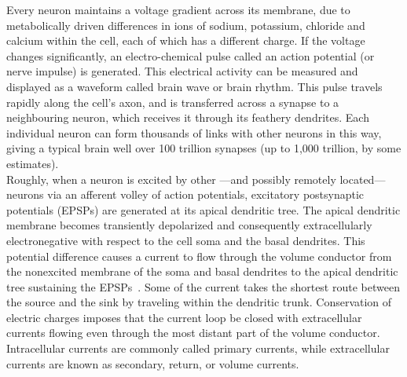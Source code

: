 Every neuron maintains a voltage gradient across its membrane, due to metabolically driven differences in ions of sodium, potassium, chloride and calcium within the cell, each of which has a different charge. If the voltage changes significantly, an electro-chemical pulse called an action potential (or nerve impulse) is generated. This electrical activity can be measured and displayed as a waveform called brain wave or brain rhythm. This pulse travels rapidly along the cell's axon, and is transferred across a synapse to a neighbouring neuron, which receives it through its feathery dendrites. Each individual neuron can form thousands of links with other neurons in this way, giving a typical brain well over 100 trillion synapses (up to 1,000 trillion, by some estimates).\\

Roughly, when a neuron is excited by other —and possibly remotely located— neurons via an afferent volley of action potentials, excitatory postsynaptic potentials (EPSPs) are generated at its apical dendritic tree. The apical dendritic membrane becomes transiently depolarized and consequently extracellularly electronegative with respect to the cell soma and the basal dendrites. This potential difference causes a current to flow through the volume conductor from the nonexcited membrane of the soma and basal dendrites to the apical dendritic tree sustaining the EPSPs~\cite{gloor1985neuronal}.
Some of the current takes the shortest route between the source and the sink by traveling within the dendritic trunk. Conservation of electric charges imposes that the current loop be closed with extracellular currents flowing even through the most distant part of the volume conductor. Intracellular currents are commonly called primary currents, while extracellular currents are known as secondary, return, or volume currents.\\

